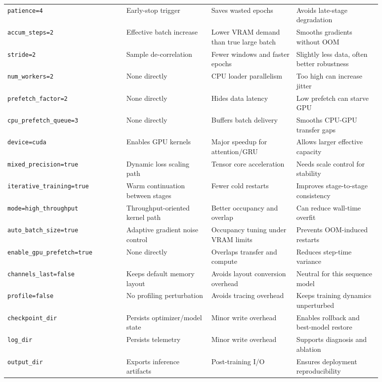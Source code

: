 \documentclass{article}
\begin{document}
\begin{longtable}{P{0.28\linewidth}P{0.20\linewidth}P{0.20\linewidth}P{0.20\linewidth}}
\texttt{patience=4} & Early-stop trigger & Saves wasted epochs & Avoids late-stage degradation \\
\texttt{accum\_steps=2} & Effective batch increase & Lower VRAM demand than true large batch & Smooths gradients without OOM \\
\texttt{stride=2} & Sample de-correlation & Fewer windows and faster epochs & Slightly less data, often better robustness \\
\texttt{num\_workers=2} & None directly & CPU loader parallelism & Too high can increase jitter \\
\texttt{prefetch\_factor=2} & None directly & Hides data latency & Low prefetch can starve GPU \\
\texttt{cpu\_prefetch\_queue=3} & None directly & Buffers batch delivery & Smooths CPU-GPU transfer gaps \\
\texttt{device=cuda} & Enables GPU kernels & Major speedup for attention/GRU & Allows larger effective capacity \\
\texttt{mixed\_precision=true} & Dynamic loss scaling path & Tensor core acceleration & Needs scale control for stability \\
\texttt{iterative\_training=true} & Warm continuation between stages & Fewer cold restarts & Improves stage-to-stage consistency \\
\texttt{mode=high\_throughput} & Throughput-oriented kernel path & Better occupancy and overlap & Can reduce wall-time overfit \\
\texttt{auto\_batch\_size=true} & Adaptive gradient noise control & Occupancy tuning under VRAM limits & Prevents OOM-induced restarts \\
\texttt{enable\_gpu\_prefetch=true} & None directly & Overlaps transfer and compute & Reduces step-time variance \\
\texttt{channels\_last=false} & Keeps default memory layout & Avoids layout conversion overhead & Neutral for this sequence model \\
\texttt{profile=false} & No profiling perturbation & Avoids tracing overhead & Keeps training dynamics unperturbed \\
\texttt{checkpoint\_dir} & Persists optimizer/model state & Minor write overhead & Enables rollback and best-model restore \\
\texttt{log\_dir} & Persists telemetry & Minor write overhead & Supports diagnosis and ablation \\
\texttt{output\_dir} & Exports inference artifacts & Post-training I/O & Ensures deployment reproducibility \\
\bottomrule
\end{longtable}
\setlength{\tabcolsep}{6pt}
\end{document}
